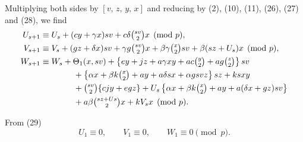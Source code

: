 \documentclass[oneside]{article}
\begin{document}
Multiplying both sides by $[v,\, z,\, y,\, x]$ and reducing by (2), (10), (11),
(26), (27) and (28), we find
\begin{align*}
U_{s+1} &\equiv U_s + (cy + \gamma x)sv + c \delta\tbinom{sv}{2}x \pmod{p}, \\
V_{s+1} &\equiv V_s + (gz + \delta x)sv + \gamma g\tbinom{sv}{2}x
  + \beta\gamma\tbinom{x}{2}sv + \beta (sz + U_s)x \pmod{p}, \\
W_{s+1} &\equiv W_s + \Theta_1 (x, sv) + \left\{ey + jz + a \gamma xy +
    ac\tbinom{y}{2} + ag\tbinom{z}{2} \right\}sv \\
 & \qquad \qquad + \left\{\alpha x + \beta k\tbinom{x}{2}
    + ay + a\delta sx + \alpha gsvz\right\}sz + ksxy \\
 & \qquad \qquad + \tbinom{sv}{2}\{cjy + egz\} + U_s \left\{\alpha x
    + \beta k\tbinom{x}{2} + ay + a(\delta x + gz)sv\right\} \\
 & \qquad \qquad + a\beta\tbinom{sz + Us}{2}x + kV_s x \pmod{p}.
\end{align*}

From (29)
\begin{equation*}
U_1 \equiv 0, \qquad V_1 \equiv 0, \qquad W_1 \equiv 0 \pmod{p}.
\end{equation*}
\end{document}
